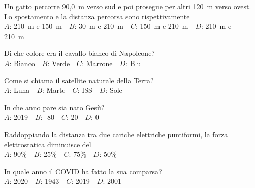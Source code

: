 \mcquestionfooter



\def\mcquestionnumber{2}


\mcquestionheader Un gatto percorre 90,0~m verso sud e poi prosegue per altri 120~m verso ovest. Lo spostamento e la distanza percorsa sono rispettivamente\\
{$A$}: 210~m e 150~m\ \ {$B$}: 30~m e 210~m\ \ {$C$}: 150~m e 210~m\ \ {$D$}: 210~m e 210~m\ \ 

\mcquestionfooter



\def\mcquestionnumber{3}


\mcquestionheader Di che colore era il cavallo bianco di Napoleone?\\
{$A$}: Bianco\ \ {$B$}: Verde\ \ {$C$}: Marrone\ \ {$D$}: Blu\ \ 

\mcquestionfooter



\def\mcquestionnumber{4}


\mcquestionheader Come si chiama il satellite naturale della Terra?\\
{$A$}: Luna\ \ {$B$}: Marte\ \ {$C$}: ISS\ \ {$D$}: Sole\ \ 

\mcquestionfooter



\def\mcquestionnumber{5}


\mcquestionheader In che anno pare sia nato Gesù?\\
{$A$}: 2019\ \ {$B$}: -80\ \ {$C$}: 20\ \ {$D$}: 0\ \ 

\mcquestionfooter



\def\mcquestionnumber{6}


\mcquestionheader Raddoppiando la distanza tra due cariche elettriche puntiformi, la forza elettrostatica diminuisce del\\
{$A$}: 90\%\ \ {$B$}: 25\%\ \ {$C$}: 75\%\ \ {$D$}: 50\%\ \ 

\mcquestionfooter



\def\mcquestionnumber{7}


\mcquestionheader In quale anno il COVID ha fatto la sua comparsa?\\
{$A$}: 2020\ \ {$B$}: 1943\ \ {$C$}: 2019\ \ {$D$}: 2001\ \ 

\mcquestionfooter



\def\mcquestionnumber{8}


